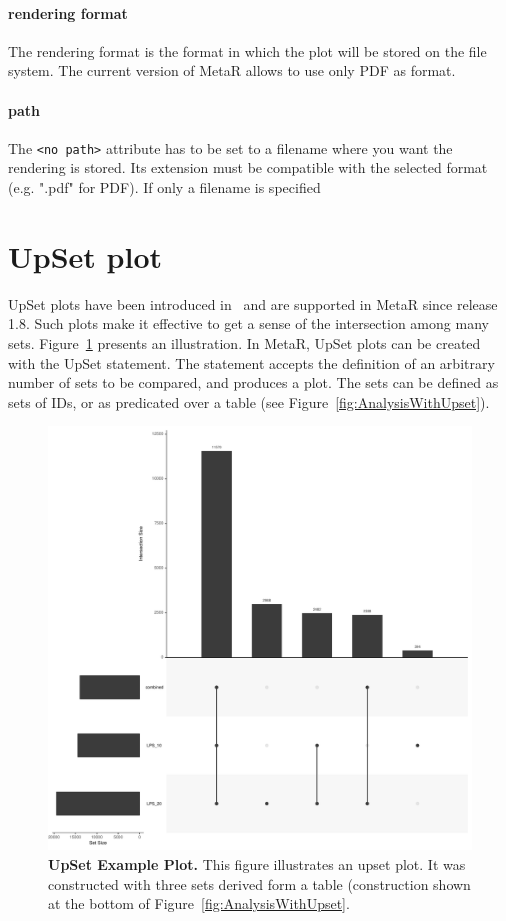 \paragraph{rendering format}
The rendering format is the format in which the plot will be stored on the file system. The current version of MetaR allows to use only PDF as format. 

\paragraph{path}
The \texttt{<no path>} attribute has to be set to a filename where you want the rendering is stored. Its extension must be compatible with the selected format (e.g. ".pdf" for PDF). If only a filename is specified

\section{UpSet plot}
UpSet plots have been introduced in~\cite{Lex2014} and are supported in MetaR since release 1.8. Such plots make it effective to get a sense of the intersection among many sets. Figure~\ref{fig:UpsetPlotExample} presents an illustration.
In MetaR, UpSet plots can be created with the UpSet statement. The statement accepts the definition of an arbitrary number of sets to be compared, and produces a plot. The sets can be defined as sets of IDs, or as predicated over a table (see Figure~\ref{fig:AnalysisWithUpset}).

\begin{figure}[h!tbp]
  \centering
  \includegraphics[width=\figWidthWide]{figures/upset.pdf}
\caption[UpSet Example Plot.]{\textbf{UpSet Example Plot.} This figure illustrates an upset plot. It was constructed with three sets derived form a table (construction shown at the bottom of Figure~\ref{fig:AnalysisWithUpset}.}
\label{fig:UpsetPlotExample}
\end{figure}
 
